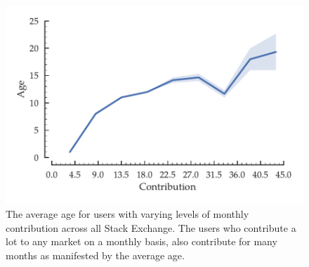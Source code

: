 \begin{figure}[hbt]
\centering
\includegraphics[scale=0.5]{Figures/Age_vs_Contribution.pdf}
\caption{The average age for users with varying levels of monthly contribution across all Stack Exchange. The users who contribute a lot to any market on a monthly basis, also contribute for many months as manifested by the average age.}
\label{fig:age_vs_contribution}
\end{figure}


